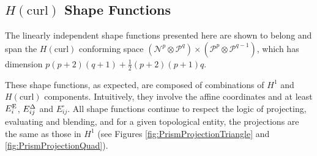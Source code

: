



\subsection{\texorpdfstring{$H(\mathrm{curl})$}{Hcurl} Shape Functions}

The linearly independent shape functions presented here are shown to belong and span the $H(\mathrm{curl})$ conforming space $(\mathcal{N}^p\otimes\mathcal{P}^q)\times(\mathcal{P}^p\otimes\mathcal{P}^{q-1})$, which has dimension $p(p+2)(q+1)+\frac{1}{2}(p+2)(p+1)q$.


These shape functions, as expected, are composed of combinations of $H^1$ and $H(\mathrm{curl})$ components. 
Intuitively, they involve the affine coordinates and at least $E_i^{\mathrm{E}}$, $E_{ij}^\Delta$ and $E_{ij}^\square$.
All shape functions continue to respect the logic of projecting, evaluating and blending, and for a given topological entity, the projections are the same as those in $H^1$ (see Figures \ref{fig:PrismProjectionTriangle} and \ref{fig:PrismProjectionQuad}).



